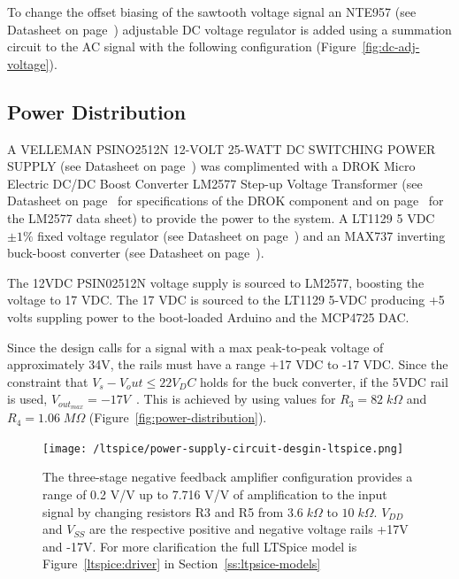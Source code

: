 \documentclass[12pt,journal]{IEEEtran}
\begin{document}
To change the offset biasing of the sawtooth voltage signal an NTE957 (see Datasheet on page~\pageref{datasheet:nte957}) adjustable DC voltage regulator is added using a summation circuit to the AC signal with the following configuration (Figure~\ref{fig:dc-adj-voltage}).


\subsection{Power Distribution}

A VELLEMAN PSINO2512N 12-VOLT 25-WATT DC SWITCHING POWER SUPPLY (see Datasheet on page~\pageref{datasheet:psino2512n}) was complimented with a DROK Micro Electric DC/DC Boost Converter LM2577 Step-up Voltage Transformer (see Datasheet on page~\pageref{datasheet:drok} for specifications of the DROK component and on page~\pageref{datasheet:lm2577} for the LM2577 data sheet) to provide the power to the system. A LT1129 5 VDC $\pm 1\%$ fixed voltage regulator (see Datasheet on page~\pageref{datasheet:nte941m}) and an MAX737 inverting buck-boost converter (see Datasheet on page~\pageref{datasheet:max737}). 

The 12VDC PSIN02512N voltage supply is sourced to LM2577, boosting the voltage to 17 VDC. The 17 VDC is sourced to the LT1129 5-VDC producing +5 volts suppling power to the boot-loaded Arduino and the MCP4725 DAC. 

Since the design calls for a signal with a max peak-to-peak voltage of approximately 34V, the rails must have a range +17 VDC to -17 VDC. Since the constraint that $V_s - V_out \leq 22 V_DC$ holds for the buck converter, if the 5VDC rail is used, $V_{out_{max}} = -17 V$~\cite{datasheet_max635}. This is achieved by using values for $R_3 = 82\;k\Omega$ and $R_4 = 1.06\;M\Omega$ (Figure~\ref{fig:power-distribution}). 

\begin{figure}[tb]
  \centering
	\texttt{[image: /ltspice/power-supply-circuit-desgin-ltspice.png]}
	\caption[Cavity Mounts]{The three-stage negative feedback amplifier configuration provides a range of 0.2 V/V up to 7.716 V/V of amplification to the input signal by changing resistors R3 and R5 from $3.6\;k\Omega$ to $10\;k\Omega$. $V_{DD}$ and $V_{SS}$ are the respective positive and negative voltage rails +17V and -17V. For more clarification the full LTSpice model is Figure~\ref{ltspice:driver} in Section~\ref{ss:ltpsice-models}}
	\label{fig:amplifier-configuration}
\end{figure}
\end{document}
